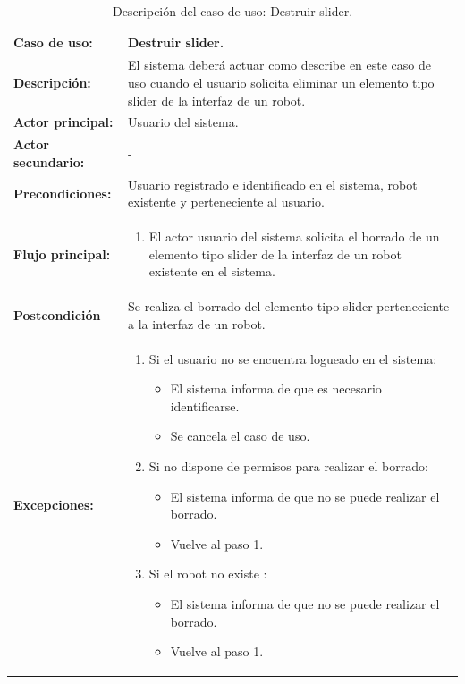 \begin{table}[H]
  \begin{center}
    \begin{tabular}{|p{3.5cm}|p{10cm}|}
      \hline
      {\textbf{Caso de uso:}} & { Destruir slider.} \\
      \hline
      {\textbf{Descripción:}} & { El sistema deberá actuar como describe en este caso de uso cuando el usuario solicita eliminar un elemento tipo slider de la interfaz de un robot.} \\
     \hline
      {\textbf{Actor principal:}} & { Usuario del sistema.} \\
      \hline
      {\textbf{Actor secundario:}} & { - } \\
      \hline
      {\textbf{Precondiciones:}} & { Usuario registrado e identificado en el sistema, robot existente y perteneciente al usuario. } \\
     \hline   
    {\textbf{Flujo principal:}} & { 
      \begin{enumerate}
	\item El actor usuario del sistema solicita el borrado de un elemento tipo slider de la interfaz de un robot existente en el sistema.
      \end{enumerate}
      } \\
     \hline
     {\textbf{Postcondición}} & {Se realiza el borrado del elemento tipo slider perteneciente a la interfaz de un robot.}\\
     \hline
         {\textbf{Excepciones:}} & {
         \begin{enumerate}
         
          \item Si el usuario no se encuentra logueado en el sistema:
	  \begin{itemize}
	    \item El sistema informa de que es necesario identificarse.
	    \item Se cancela el caso de uso.
	  \end{itemize}
         
          \item Si no dispone de permisos para realizar el borrado:
          \begin{itemize}
           \item El sistema informa de que no se puede realizar el borrado.
           \item Vuelve al paso 1.
          \end{itemize}
	  \item Si el robot no existe :
	    \begin{itemize}
	      \item El sistema informa de que no se puede realizar el borrado.
	      \item Vuelve al paso 1.
	   \end{itemize}	   
         \end{enumerate}
         }\\
     \hline
    \end{tabular}
  \end{center}
\caption{Descripción del caso de uso: Destruir slider.}
\end{table}



